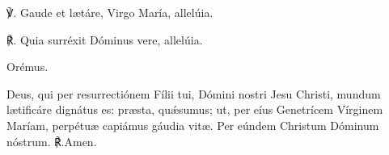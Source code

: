 ℣. Gaude et lætáre, Virgo María, allelúia.

℟. Quia surréxit Dóminus vere, allelúia.

Orémus.

Deus, qui per resurrectiónem Fílii tui, Dómini nostri Jesu Christi, mundum lætificáre dignátus es: præsta, quǽsumus; ut, per eíus Genetrícem Vírginem Maríam, perpétuæ capiámus gáudia vitæ. Per eúndem Christum Dóminum nóstrum.  ℟.Amen.